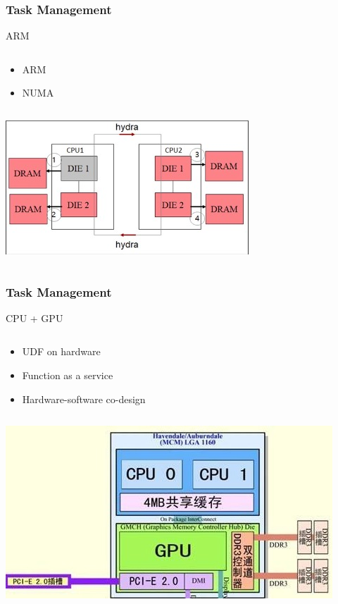 \begin{frame}
\frametitle{Task Management}
\begin{block}{ARM}
\begin{column}{.5\textwidth}

\begin{itemize}
	\item ARM
	\item NUMA
\end{itemize} 

\end{column}
\begin{column}{.5\textwidth}
\includegraphics[width=\textwidth]{fig23/numa.jpg}
\end{column}

\end{block}
\end{frame}

\begin{frame}
\frametitle{Task Management}
\begin{block}{CPU + GPU}
\begin{column}{.5\textwidth}

\begin{itemize}
	\item UDF on hardware 
	\item Function as a service
	\item Hardware-software co-design
\end{itemize} 

\end{column}
\begin{column}{.5\textwidth}
\includegraphics[width=\textwidth]{fig23/cpugpu.jpg}
\end{column}

\end{block}
\end{frame}



